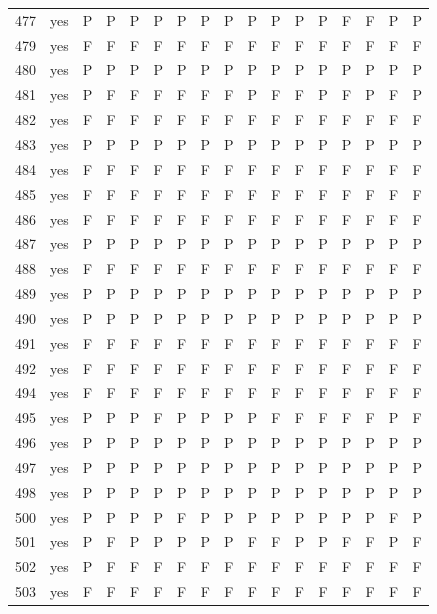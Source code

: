 \begin{table}[p]
\begin{tabular*}{\textwidth}{@{\extracolsep{\fill}}rcccccccccccccccc}
477 & yes & P & P & P & P & P & P & P & P & P & P & P & F & F & P & P\\
479 & yes & F & F & F & F & F & F & F & F & F & F & F & F & F & F & F\\
480 & yes & P & P & P & P & P & P & P & P & P & P & P & P & P & P & P\\
481 & yes & P & F & F & F & F & F & F & P & F & F & P & F & P & F & P\\
482 & yes & F & F & F & F & F & F & F & F & F & F & F & F & F & F & F\\
483 & yes & P & P & P & P & P & P & P & P & P & P & P & P & P & P & P\\
484 & yes & F & F & F & F & F & F & F & F & F & F & F & F & F & F & F\\
485 & yes & F & F & F & F & F & F & F & F & F & F & F & F & F & F & F\\
486 & yes & F & F & F & F & F & F & F & F & F & F & F & F & F & F & F\\
487 & yes & P & P & P & P & P & P & P & P & P & P & P & P & P & P & P\\
488 & yes & F & F & F & F & F & F & F & F & F & F & F & F & F & F & F\\
489 & yes & P & P & P & P & P & P & P & P & P & P & P & P & P & P & P\\
490 & yes & P & P & P & P & P & P & P & P & P & P & P & P & P & P & P\\
491 & yes & F & F & F & F & F & F & F & F & F & F & F & F & F & F & F\\
492 & yes & F & F & F & F & F & F & F & F & F & F & F & F & F & F & F\\
494 & yes & F & F & F & F & F & F & F & F & F & F & F & F & F & F & F\\
495 & yes & P & P & P & F & P & P & P & P & F & F & F & F & F & P & F\\
496 & yes & P & P & P & P & P & P & P & P & P & P & P & P & P & P & P\\
497 & yes & P & P & P & P & P & P & P & P & P & P & P & P & P & P & P\\
498 & yes & P & P & P & P & P & P & P & P & P & P & P & P & P & P & P\\
500 & yes & P & P & P & P & F & P & P & P & P & P & P & P & P & F & P\\
501 & yes & P & F & P & P & P & P & P & F & F & P & P & F & F & P & F\\
502 & yes & P & F & F & F & F & F & F & F & F & F & F & F & F & F & F\\
503 & yes & F & F & F & F & F & F & F & F & F & F & F & F & F & F & F\\
\bottomrule\end{tabular*}\end{table}
\clearpage

